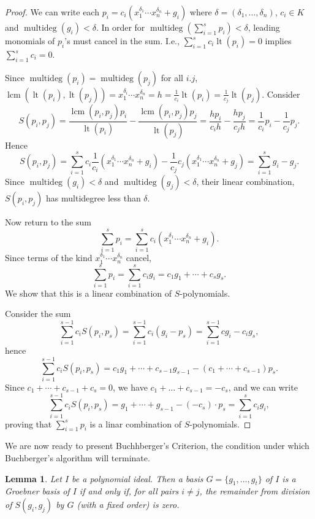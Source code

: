 \documentclass[
]{book}
\newtheorem{lemma}{Lemma}[chapter]
\theoremstyle{definition}
\theoremstyle{definition}
\theoremstyle{definition}
\theoremstyle{definition}
\theoremstyle{remark}
\begin{document}
\begin{proof}
We can write each \(p_i = c_i (x_1^{\delta_1} \cdots x_n^{\delta_n} + g_i)\) where \(\delta = (\delta_1,\ldots, \delta_n)\), \(c_i \in K\) and \(\operatorname{multideg}(g_i) < \delta\).
In order for \(\operatorname{multideg}(\sum_{i=1}^s p_i) < \delta\), leading monomials of \(p_i\)'s must cancel in the sum. I.e., \(\sum_{i=1}^s c_i\operatorname{lt}(p_i) = 0\) implies \(\sum_{i=1}^s c_i = 0\).

Since \(\operatorname{multideg}(p_i) = \operatorname{multideg}(p_j)\) for all \(i.j\), \(\operatorname{lcm}(\operatorname{lt}(p_i),\operatorname{lt}(p_j)) = x_1^{\delta_i} \cdots x_n^{\delta_n} = h = \tfrac{1}{c_i}\operatorname{lt}(p_i) = \tfrac{1}{c_j}\operatorname{lt}(p_j)\). Consider
\[
S(p_i,p_j) = \dfrac{\operatorname{lcm}(p_i,p_j)p_i}{\operatorname{lt}(p_i)} - \dfrac{\operatorname{lcm}(p_i,p_j)p_j}{\operatorname{lt}(p_j)} = \dfrac{h p_i}{c_i h} - \dfrac{h p_j}{c_j h} = \dfrac{1}{c_i}p_i - \dfrac{1}{c_j}p_j.
\]
Hence
\[
S(p_i,p_j) = \sum_{i=1}^s c_i\dfrac{1}{c_i}(x_1^{\delta_1}\cdots x_n^{\delta_n} + g_i) - \dfrac{1}{c_j}c_j(x_1^{\delta_1}\cdots x_n^{\delta_n} + g_j) = \sum_{i=1}^s g_i - g_j.
\]
Since \(\operatorname{multideg}(g_i) < \delta\) and \(\operatorname{multideg}(g_j) < \delta\), their linear combination, \(S(p_i,p_j)\) has multidegree less than \(\delta\).

Now return to the sum
\[
\sum_{i=1}^s p_i = \sum_{i=1}^s c_i (x_1^{\delta_1} \cdots x_n^{\delta_n} + g_i).
\]
Since terms of the kind \(x_1^{\delta_1}\cdots x_n^{\delta_n}\) cancel,
\[\sum_{i=1}^s p_i = \sum_{i=1}^s c_ig_i = c_1g_1 + \cdots + c_s g_s.\]
We show that this is a linear combination of \(S\)-polynomials.

Consider the sum
\[
\sum_{i=1}^{s-1} c_i S(p_i,p_s) = \sum_{i=1}^{s-1} c_i( g_i - p_s)
= \sum_{i=1}^{s-1} cg_i - c_ig_s,
\] hence
\[
\sum_{i=1}^{s-1} c_i S(p_i,p_s) = c_1g_1 + \cdots + c_{s-1}g_{s-1} - \left( c_1 + \cdots + c_{s-1} \right) p_s.
\]
Since \(c_1 + \cdots + c_{s-1} + c_s = 0\), we have \(c_1 + \ldots + c_{s-1} = -c_s\), and we can write
\[
\sum_{i=1}^{s-1} c_i S(p_i,p_s) = g_1 + \cdots + g_{s-1} - (-c_s) \cdot p_s = \sum_{i=1}^{s} c_i g_i,
\]
proving that \(\sum_{i=1}^s p_i\) is a linar combination of \(S\)-polynomials.
\end{proof}

We are now ready to present Buchhberger's Criterion, the condition under which Buchberger's algorithm will terminate.

\begin{lemma}
\protect\hypertarget{lem:buchberger-criterion}{}\label{lem:buchberger-criterion}Let \(I\) be a polynomial ideal. Then a basis \(G = \{g_1, \ldots, g_t\}\) of \(I\) is a Groebner basis of \(I\) if and only if, for all pairs \(i \ne j\), the
remainder from division of \(S(g_i, g_j)\) by \(G\) (with a fixed order) is zero.
\end{lemma}
\end{document}
